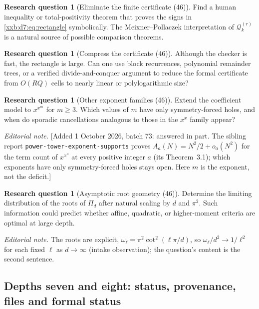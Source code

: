 \documentclass[11pt,a4paper]{article}
\numberwithin{equation}{section}
\theoremstyle{definition}
\newtheorem{question}[theorem]{Research question}
\theoremstyle{remark}
\theoremstyle{plain}
\newcommand{\sibPTE}{\texttt{power-\allowbreak{}tower-\allowbreak{}exponent-\allowbreak{}supports}}
\begin{document}
\begin{question}[Eliminate the finite certificate (46)]\label{xxb:d7:q:eliminate}
Find a human inequality or total-positivity theorem that proves the signs in
\eqref{xxb:d7:eq:rectangle} symbolically.  The Meixner--Pollaczek
interpretation of $\mathcal Q_k^{(r)}$ is a natural source of possible
comparison theorems.
\end{question}

\begin{question}[Compress the certificate (46)]\label{xxb:d7:q:compress}
Although the checker is fast, the rectangle is large.  Can one use block
recurrences, polynomial remainder trees, or a verified divide-and-conquer
argument to reduce the formal certificate from $O(RQ)$ cells to nearly linear
or polylogarithmic size?
\end{question}

\begin{question}[Other exponent families (46)]\label{xxb:d7:q:families}
Extend the coefficient model to $x^{x^m}$ for $m\geq3$.  Which values of $m$
have only symmetry-forced holes, and when do sporadic cancellations analogous
to those in the $x^x$ family appear?
\end{question}
\emph{Editorial note.}  [Added 1 October 2026, batch 73: answered in part.
The sibling report \sibPTE{} proves $A_a(N)=N^2/2+o_a(N^2)$ for the term count
of $x^{x^a}$ at every positive integer $a$ (its Theorem~3.1); which exponents
have only symmetry-forced holes stays open.  Here $m$ is the exponent, not the
deficit.]

\begin{question}[Asymptotic root geometry (46)]\label{xxb:d7:q:roots}
Determine the limiting distribution of the roots of $\Pi_d$ after natural
scaling by $d$ and $\pi^2$.  Such information could predict whether affine,
quadratic, or higher-moment criteria are optimal at large depth.
\end{question}
\emph{Editorial note.}  The roots are explicit, $\omega_\ell=\pi^2\cot^2(\ell\pi/d)$,
so $\omega_\ell/d^2\to1/\ell^2$ for each fixed $\ell$ as $d\to\infty$
(intake observation); the question's content is the second sentence.

\subsection{Depths seven and eight: status, provenance, files and formal status}\label{xxb:d78:sec:provenance}
\end{document}
